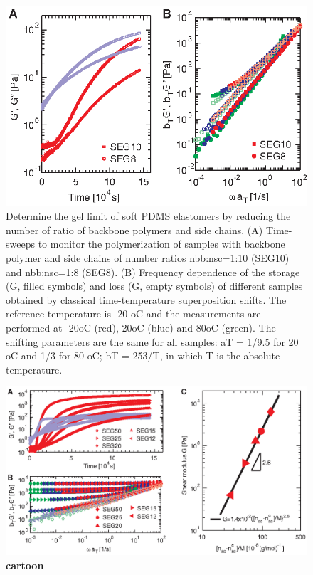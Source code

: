 \documentclass[8.5pt,twoside,twocolumn]{article}
\begin{document}
\begin{figure}[h]
\centering
\includegraphics[scale=1]{figures/fig2.eps}
\caption{Determine the gel limit of soft PDMS elastomers by reducing the
number of ratio of backbone polymers and side chains. (A) Time-sweeps to
monitor the polymerization of samples with backbone polymer and side chains
of number ratios nbb:nsc=1:10 (SEG10) and nbb:nsc=1:8 (SEG8). (B) Frequency
dependence of the storage (G, filled symbols) and loss (G, empty symbols) of
different samples obtained by classical time-temperature superposition
shifts. The reference temperature is -20 oC and the measurements are
performed at -20oC (red), 20oC (blue) and 80oC (green). The shifting
parameters are the same for all samples: aT = 1/9.5 for 20 oC and 1/3 for 80
oC; bT = 253/T, in which T is the absolute temperature. }
\label{fig:11}
\end{figure}

\begin{figure}[h]
\centering
\includegraphics[scale=1]{figures/fig3.eps}
\caption{\textbf{cartoon}}
\label{fig:illustration}
\end{figure}
\end{document}
